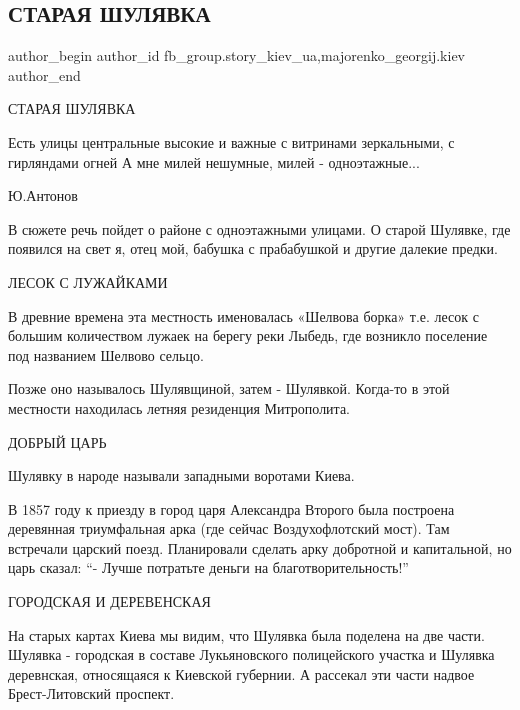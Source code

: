  
 
 
 
 
 
\subsection{СТАРАЯ ШУЛЯВКА}
\label{sec:26_12_2021.fb.fb_group.story_kiev_ua.5.staraja_shuljavka}
 
\ifcmt
 author_begin
   author_id fb_group.story_kiev_ua,majorenko_georgij.kiev
 author_end
\fi

СТАРАЯ ШУЛЯВКА

\obeycr
Есть улицы центральные
высокие и важные
с витринами зеркальными,
с гирляндами огней
А мне милей нешумные,
милей - одноэтажные...
\restorecr

Ю.Антонов

В сюжете речь пойдет о районе с одноэтажными улицами. О старой Шулявке, где
появился на свет я, отец мой, бабушка с прабабушкой и другие далекие предки. 

ЛЕСОК С ЛУЖАЙКАМИ

В древние времена эта местность именовалась «Шелвова борка» т.е. лесок с
большим количеством лужаек на берегу реки Лыбедь, где возникло поселение под
названием Шелвово сельцо.

Позже оно называлось Шулявщиной, затем - Шулявкой. Когда-то в этой местности
находилась летняя резиденция Митрополита.

ДОБРЫЙ ЦАРЬ

Шулявку в народе называли западными воротами Киева. 

В 1857 году к приезду в город царя Александра Второго была построена деревянная
триумфальная арка (где сейчас Воздухофлотский мост). Там встречали царский
поезд. Планировали сделать арку добротной и капитальной, но царь сказал:
\enquote{- Лучше потратьте деньги на благотворительность!}

ГОРОДСКАЯ И ДЕРЕВЕНСКАЯ

На старых картах Киева мы видим, что Шулявка была поделена на две части.
Шулявка - городская в составе Лукьяновского полицейского участка и Шулявка
деревнская, относящаяся к Киевской губернии. А рассекал эти части надвое
Брест-Литовский проспект.  

